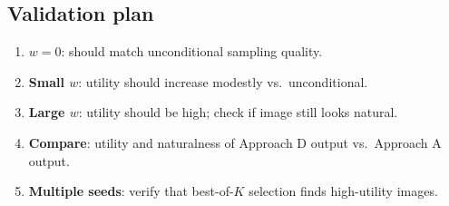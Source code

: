 \documentclass[11pt]{article}
\begin{document}
\subsection{Validation plan}

\begin{enumerate}[nosep]
    \item \textbf{$w = 0$}: should match unconditional sampling quality.
    \item \textbf{Small $w$}: utility should increase modestly vs.\ unconditional.
    \item \textbf{Large $w$}: utility should be high; check if image still looks natural.
    \item \textbf{Compare}: utility and naturalness of Approach D output vs.\ Approach A output.
    \item \textbf{Multiple seeds}: verify that best-of-$K$ selection finds high-utility images.
\end{enumerate}
\end{document}
